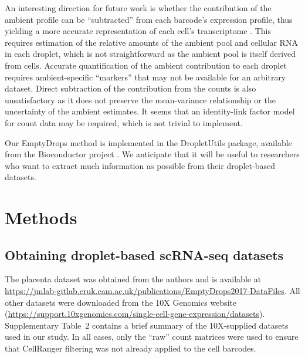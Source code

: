 \documentclass{bmcart}
\newcommand{\supptabdataset}{2}
\begin{document}
An interesting direction for future work is whether the contribution of the ambient profile can be ``subtracted'' from each barcode's expression profile, thus yielding a more accurate representation of each cell's transcriptome \cite{young2018soupx}.
This requires estimation of the relative amounts of the ambient pool and cellular RNA in each droplet,
which is not straightforward as the ambient pool is itself derived from cells.
Accurate quantification of the ambient contribution to each droplet requires ambient-specific ``markers'' that may not be available for an arbitrary dataset.
Direct subtraction of the contribution from the counts is also unsatisfactory as it does not preserve the mean-variance relationship or the uncertainty of the ambient estimates.
It seems that an identity-link factor model for count data may be required, which is not trivial to implement. 

Our EmptyDrops method is implemented in the \textsf{DropletUtils} package, available from the Bioconductor project \cite{huber2015orchestrating}.
We anticipate that it will be useful to researchers who want to extract much information as possible from their droplet-based datasets.

\section*{Methods}

\subsection*{Obtaining droplet-based scRNA-seq datasets}
The placenta dataset was obtained from the authors \cite{vento2018single} and is available at \url{https://jmlab-gitlab.cruk.cam.ac.uk/publications/EmptyDrops2017-DataFiles}.
All other datasets were downloaded from the 10X Genomics website (\url{https://support.10xgenomics.com/single-cell-gene-expression/datasets}).
Supplementary Table~\supptabdataset{} contains a brief summary of the 10X-supplied datasets used in our study.
In all cases, only the ``raw'' count matrices were used to ensure that CellRanger filtering was not already applied to the cell barcodes.
\end{document}
